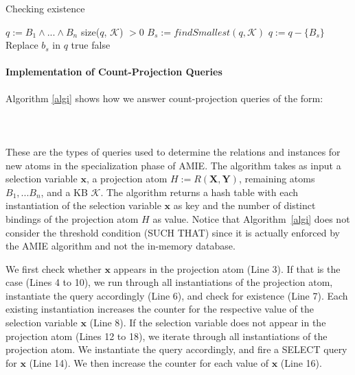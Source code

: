 {\begin{algorithm}
\caption{Checking existence}
\label{exists}
\begin{algorithmic}[1]
    \State $q := B_1 \wedge ... \wedge B_n$
      \State \Return size($q$, $\mathcal{K}$) $> 0$
    \Else
      \State $B_s := findSmallest(q, \mathcal{K})$
      \State $q := q - \{ B_s \} $
	\State Replace $b_s$ in $q$
	    \State \Return true
	  \EndIf
      \EndFor
    \EndIf
    \State \Return false
\EndFunction
\end{algorithmic}
\end{algorithm}

\paragraph{Implementation of Count-Projection Queries} Algorithm \ref{algi} shows how we answer count-projection queries
of the form: \\ \\
 \\ \\
These are the types of queries used to determine the relations and instances for new atoms in the specialization
phase of AMIE. The algorithm takes as input a selection variable $\bm{x}$, a projection atom $H:=R(\bm{X},\bm{Y})$, remaining atoms $B_1, ... B_n$, 
and a KB $\mathcal{K}$. 
The algorithm returns a hash table with each instantiation of the selection variable 
$\bm{x}$ as key and the number of distinct bindings of the projection atom $H$ as value. Notice that Algorithm~\ref{algi}
does not consider the threshold condition (SUCH THAT) since it is actually enforced by the AMIE algorithm and not 
the in-memory database. 

We first check whether $\bm{x}$ appears in the projection atom (Line 3).
If that is the case (Lines 4 to 10), we run through all instantiations of the projection atom, instantiate the query accordingly (Line 6), and check for existence (Line 7).
Each existing instantiation increases the counter for the respective value of the selection variable $\bm{x}$ (Line 8). 
If the selection variable does not appear in the projection atom (Lines 12 to 18), 
we iterate through all instantiations of the projection atom.
We instantiate the query accordingly, and fire a SELECT query for $\bm{x}$ (Line 14). 
We then increase the counter for each value of $\bm{x}$ (Line 16).

}
